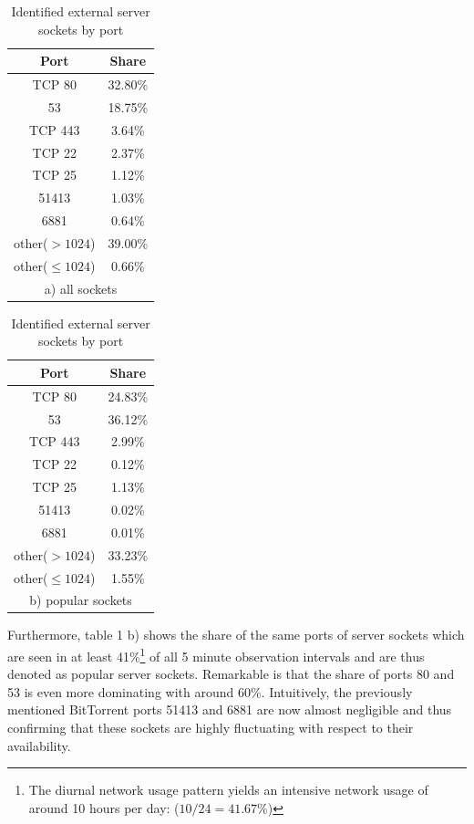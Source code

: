 \documentclass{sigcomm-alternate}
\begin{document}
\begin{table}[ht]
	\begin{minipage}[b]{0.45\linewidth}
	\centering
	\begin{tabular}{|c|c|}
	\hline
	Port & Share \\
	\hline \hline
	TCP 80 & 32.80\%  \\
	\hline
	53 & 18.75\%  \\
	\hline
	TCP 443 & 3.64\% \\
	\hline
	TCP 22  & 2.37\%\\
	\hline
	TCP 25 & 1.12\%\\
	\hline
	51413 & 1.03\%\\
	\hline
	6881 & 0.64\% \\
	\hline
	other($>1024$) & 39.00\% \\ 
	\hline
	other($\le1024$) & 0.66\%\\
	\hline
	\multicolumn{2}{c}{a) all sockets}
	\end{tabular}
	\end{minipage}
\hspace{0.25cm}
\begin{minipage}[b]{0.45\linewidth}
\centering
\begin{tabular}{|c|c|}
	\hline
	Port & Share \\
	\hline \hline
	TCP 80 & 24.83\%  \\
	\hline
	53 & 36.12\%  \\
	\hline
	TCP 443 & 2.99\% \\
	\hline
	TCP 22  & 0.12\%\\
	\hline
	TCP 25 & 1.13\%\\
	\hline
	51413 & 0.02\%\\
	\hline
	6881 & 0.01\% \\
	\hline
	other($>1024$) & 33.23\% \\ 
	\hline
	other($\le1024$) & 1.55\%\\
	\hline
	\multicolumn{2}{c}{b) popular sockets}
\end{tabular}
\end{minipage}
\label{tab:socketsport}
\caption{Identified external server sockets by port}
\end{table}

Furthermore, table 1 b) shows the share of the same ports of server sockets
which are seen in at least 41\%\footnote{The diurnal network usage pattern yields an intensive network usage of around 10 hours per day: ($10/24 = 41.67\%$) } of all 5 minute observation intervals and are thus
denoted as popular server sockets. Remarkable is that the share of ports 80 and 53
is even more dominating with around $60\%$. Intuitively, the previously mentioned
BitTorrent ports 51413 and 6881 are now almost negligible and thus confirming that
these sockets are highly fluctuating with respect to their availability.
\end{document}

